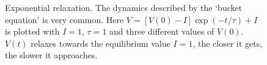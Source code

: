 \documentclass[11pt,a4paper]{scrartcl}
\begin{document}
\begin{figure}
\begin{center}

\end{center}
\caption{Exponential relaxation. The dynamics described by the
  \lq{}bucket equation\rq{} is very common. Here $V=[V(0)-I]\exp(-t/\tau)+I$ is plotted with $I=1$, $\tau=1$ and three different values of $V(0)$. $V(t)$ relaxes towards the equilibrium value $I=1$, the closer it gets, the slower it approaches.\label{bucket_v}}
\end{figure}
\end{document}
